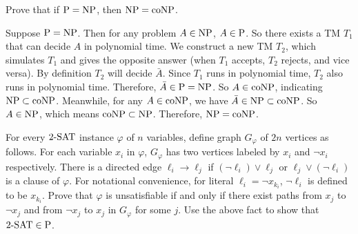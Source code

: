 \documentclass{homework}
\begin{document}
\begin{problem}
  Prove that if $\P = \NP$, then $\NP = \coNP$.
\end{problem}

\begin{solution}
  Suppose $\P=\NP$. Then for any problem $A\in\NP$, $A\in \P$. So there exists a TM $T_1$ that can decide $A$ in polynomial time. We construct a new TM $T_2$, which simulates $T_1$ and gives the opposite answer (when $T_1$ accepts, $T_2$ rejects, and vice versa). By definition $T_2$ will decide $\bar{A}$. Since $T_1$ runs in polynomial time, $T_2$ also runs in polynomial time. Therefore, $\bar{A}\in \P=\NP$. So $A\in\coNP$, indicating $\NP\subset\coNP$. Meanwhile, for any $A\in\coNP$, we have $\bar{A}\in\NP\subset\coNP$. So $A\in\NP$, which means $\coNP\subset\NP$. Therefore, $\NP=\coNP$.
\end{solution}

\begin{problem}
  For every $\TWOSAT$ instance $\varphi$ of $n$ variables, define graph
  $G_{\varphi}$ of $2n$ vertices as follows.
  For each variable $x_{i}$ in $\varphi$, $G_{\varphi}$ has two vertices labeled
  by $x_{i}$ and $\neg x_{i}$ respectively.
  There is a directed edge $\ell_{i} \to \ell_{j}$ if
  $(\neg \ell_{i}) \lor \ell_{j}$ or $\ell_{j} \lor (\neg \ell_{i})$ is a clause
  of $\varphi$.
  For notational convenience, for literal $\ell_{i} = \neg x_{k_{i}}$,
  $\neg \ell_{i}$ is defined to be $x_{k_{i}}$.
  Prove that $\varphi$ is unsatisfiable if and only if there exist
  paths from $x_{j}$ to $\neg x_{j}$ and from $\neg x_{j}$ to $x_{j}$ in
  $G_{\varphi}$ for some $j$.
  Use the above fact to show that $\TWOSAT \in \P$.
\end{problem}
\end{document}
